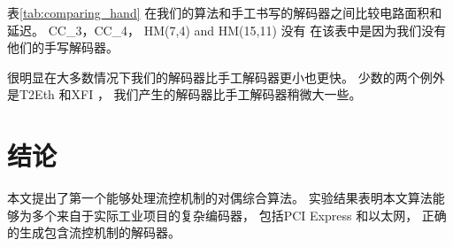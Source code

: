表\ref{tab:comparing_hand} 在我们的算法和手工书写的解码器之间比较电路面积和延迟。
CC\_3，CC\_4， HM(7,4) and HM(15,11) 没有
在该表中是因为我们没有他们的手写解码器。

很明显在大多数情况下我们的解码器比手工解码器更小也更快。
少数的两个例外是T2Eth 和XFI ，
我们产生的解码器比手工解码器稍微大一些。



\section{结论}\label{sec_conclude_chap3}

本文提出了第一个能够处理流控机制的对偶综合算法。
实验结果表明本文算法能够为多个来自于实际工业项目的复杂编码器，
包括PCI Express  和以太网，
正确的生成包含流控机制的解码器。


